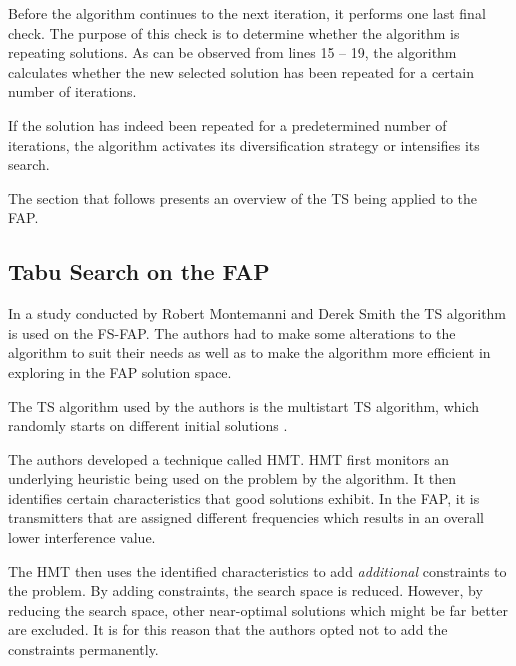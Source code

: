 Before the algorithm continues to the next iteration, it performs one last final check. The purpose of this check is to determine whether the algorithm is repeating solutions. As can be observed from lines 15 -- 19, the algorithm calculates whether the new selected solution has been repeated for a certain number of iterations. 

If the solution has indeed been repeated for a predetermined number of iterations, the algorithm activates its diversification strategy or intensifies its search.

The section that follows presents an overview of the \gls{TS} being applied to the \gls{FAP}.
\subsection{Tabu Search on the \gls{FAP}}
In a study conducted by Robert Montemanni and Derek Smith \cite{TabuMontemanniSmith} the \gls{TS} algorithm is used on the \gls{FS-FAP}. The authors had to make some alterations to the algorithm to suit their needs as well as to make the algorithm more efficient in exploring in the \gls{FAP} solution space.

The \gls{TS} algorithm used by the authors is the multistart \gls{TS} algorithm, which randomly starts on different initial solutions \cite{TabuMontemanniSmith}.

The authors developed a technique called \gls{HMT}. \gls{HMT} first monitors an underlying heuristic being used on the problem by the algorithm\cite{TabuMontemanniSmith}. It then identifies certain characteristics that good solutions exhibit. In the \gls{FAP}, it is transmitters that are assigned different frequencies which results in an overall lower interference value\cite{TabuMontemanniSmith}.

The HMT then uses the identified characteristics to add \emph{additional} constraints to the problem\cite{TabuMontemanniSmith}. By adding constraints, the search space is reduced. However, by reducing the search space, other near-optimal solutions which might be far better are excluded\cite{TabuMontemanniSmith}. It is for this reason that the authors opted not to add the constraints permanently.

